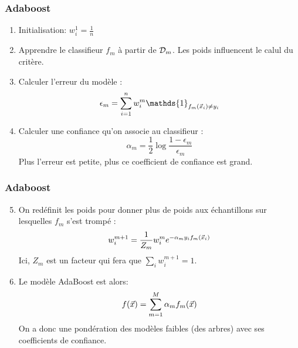 \begin{frame}
  \frametitle{Adaboost}
    \begin{enumerate}
      \item Initialisation: $w_i^1 = \frac{1}{n}$
      \item Apprendre le classifieur $f_m$ à partir de $\mathcal{D}_m$. Les poids influencent le calul du critère. 
      \item Calculer l'erreur du modèle : 
      \begin{equation*}
      \epsilon_m = \sum_{i=1}^n w_i^m \mathds{1}_{f_m(\xvec_i) \neq y_i}
      \end{equation*}
      \item Calculer une confiance qu'on associe au classifieur : 
      \begin{equation*}
      \alpha_m = \frac{1}{2}\log{\frac{1-\epsilon_m}{\epsilon_m}}
      \end{equation*}
      Plus l'erreur est petite, plus ce coefficient de confiance est grand. 
    \end{enumerate}
\end{frame}

\begin{frame}
  \frametitle{Adaboost}
    \begin{enumerate}
      \setcounter{enumi}{4}
      \item On redéfinit les poids pour donner plus de poids aux échantillons sur lesquelles $f_m$ s'est trompé : 
      \begin{equation*}
      w_i^{m+1} = \frac{1}{Z_m} w_i^{m}e^{-\alpha_m y_i f_m(\vec{x}_i)}
      \end{equation*}
      Ici, $Z_m$ est un facteur qui fera que $\sum_iw_i^{m+1}=1$. 
      \item Le modèle AdaBoost est alors: 
      \begin{equation*}
      f(\vec{x}) = \sum_{m=1}^{M}\alpha_mf_m(\vec{x})
      \end{equation*}
      On a donc une pondération des modèles faibles (des arbres) avec ses coefficients de confiance.
    \end{enumerate}
\end{frame}



